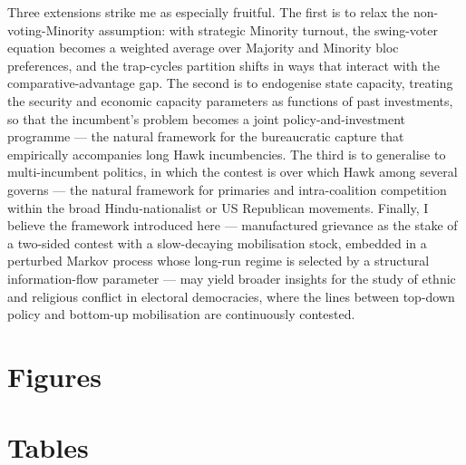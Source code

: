 \documentclass[11pt,twoside]{extarticle}
\begin{document}
Three extensions strike me as especially fruitful. The first is to relax the non-voting-Minority assumption: with strategic Minority turnout, the swing-voter equation becomes a weighted average over Majority and Minority bloc preferences, and the trap-cycles partition shifts in ways that interact with the comparative-advantage gap. The second is to endogenise state capacity, treating the security and economic capacity parameters as functions of past investments, so that the incumbent's problem becomes a joint policy-and-investment programme --- the natural framework for the bureaucratic capture that empirically accompanies long Hawk incumbencies. The third is to generalise to multi-incumbent politics, in which the contest is over which Hawk among several governs --- the natural framework for primaries and intra-coalition competition within the broad Hindu-nationalist or US Republican movements. Finally, I believe the framework introduced here --- manufactured grievance as the stake of a two-sided contest with a slow-decaying mobilisation stock, embedded in a perturbed Markov process whose long-run regime is selected by a structural information-flow parameter --- may yield broader insights for the study of ethnic and religious conflict in electoral democracies, where the lines between top-down policy and bottom-up mobilisation are continuously contested.



\clearpage
\newpage
\singlespacing
\footnotesize


\begingroup

\endgroup

\normalsize
\clearpage
\section{Figures}


\clearpage
\section{Tables}


\appendix
\renewcommand{\thesection}{\Alph{section}}
\renewcommand{\thesubsection}{\Alph{section}.\arabic{subsection}}
\renewcommand{\thetable}{A.\arabic{table}}
\renewcommand{\thefigure}{A.\arabic{figure}}
\setcounter{table}{0}
\setcounter{figure}{0}
\end{document}
